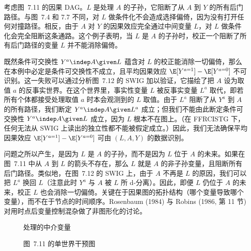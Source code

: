 \begin{finepoint}
考虑图~7.11 的因果 DAG。$L$ 是处理 $A$ 的子孙，它阻断了从 $A$ 到 $Y$ 的所有后门路径。与图~7.4 和 7.7 不同，对 $L$ 做条件化不会造成选择偏倚，因为没有打开任何对撞路径。相反，由于 $A$ 对 $Y$ 的因果效应完全通过中间变量 $L$，对 $L$ 做条件化会完全阻断这条通路。这个例子表明，当 $L$ 是 $A$ 的子孙时，校正一个阻断了所有后门路径的变量 $L$ 并不能消除偏倚。

既然条件可交换性 $Y^{a}\indep A\given L$ 蕴含对 $L$ 的校正能消除一切偏倚，那么在本例中必定是条件可交换性不成立，且平均因果效应 $\E[Y^{a=1}]-\E[Y^{a=0}]$ 不可识别。这一失败可以通过分析图~7.12 的 SWIG 加以验证，它描绘了把 $A$ 设为取值 $a$ 的反事实世界。在这个世界里，事实性变量 $L$ 被反事实变量 $L^{a}$ 取代，即若所有个体都接受处理取值 $a$ 时本会观测到的 $L$ 取值。由于 $L^{a}$ 阻断了从 $Y^{a}$ 到 $A$ 的所有路径，我们断定 $Y^{a}\indep A\given L^{a}$ 成立；但我们不能由此断定条件可交换性 $Y^{a}\indep A\given L$ 成立，因为 $L$ 根本不在图上。（在 FFRCISTG 下，任何无法从 SWIG 上读出的独立性都不能被假定成立。）因此，我们无法确保平均因果效应 $\E[Y^{a=1}]-\E[Y^{a=0}]$ 可由 $(L,A,Y)$ 的数据识别。

问题之所以产生，是因为 $L$ 是 $A$ 的子孙，而不是因为 $L$ 位于 $A$ 的未来。如果在图~7.11 中从 $A$ 到 $L$ 的箭头不存在，那么 $L$ 就是 $A$ 的非子孙变量，且阻断所有后门路径。类似地，在图~7.12 的 SWIG 上，由于 $A$ 不再是 $L$ 的原因，我们可以把 $L^{a}$ 换回 $L$（注意此时 $Y^{a}$ 与 $A$ 被 $L$ 所 d-分离）。因此，即便 $L$ 仍位于 $A$ 的未来，校正 $L$ 也会消除一切偏倚。关键在于因果图的拓扑结构（哪个变量导致哪个变量），而不在于节点的时间顺序。Rosenbaum (1984) 与 Robins (1986, 第 11 节) 对用时点后变量控制混杂做了非图形化的讨论。
\end{finepoint}

\begin{figure}[htbp]
\centering
{}
\caption{处理的中介变量}
\label{fig:7.11}
\end{figure}

\begin{figure}[htbp]
\centering
{}
\caption{图~7.11 的单世界干预图}
\label{fig:7.12}
\end{figure}

